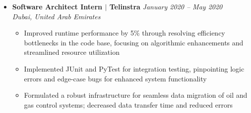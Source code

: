 \documentclass[letterpaper,11pt]{article}
\begin{document}
\begin{itemize}[leftmargin=0mm, label={}, itemsep=1pt]
  \item \textbf{Software Architect Intern $|$ Telinstra} \hfill \textit{\small January 2020 -- May 2020} \\
  \small \textit{Dubai, United Arab Emirates} \vspace{-0.15\baselineskip} %
  \begin{itemize}[leftmargin=5mm, itemsep=0pt, topsep=0pt] %
    \item \small Improved runtime performance by 5\% through resolving efficiency bottlenecks in the code base, focusing on algorithmic enhancements and streamlined resource utilization
    \item \small Implemented JUnit and PyTest for integration testing, pinpointing logic errors and edge-case bugs for enhanced system functionality
    \item \small Formulated a robust infrastructure for seamless data migration of oil and gas control systems; decreased data transfer time and reduced errors
  \end{itemize}

\end{itemize}

\vspace{-0.75\baselineskip} %

\end{document}
